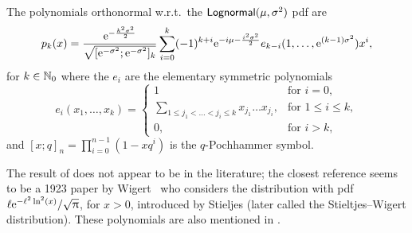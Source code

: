 \begin{theorem}\label{LogNormalOrthogonalPolynomialProposition}
The polynomials orthonormal w.r.t.\ the $\mathsf{Lognormal}(\mu, \sigma^2)$ pdf are
\begin{equation}\label{eq:OrthonormalPolynomialLogNormalExpression}
p_{k}(x) = \frac{ \mathrm{e}^{-\frac{k^{2}\sigma^{2}}{2}} }{ \sqrt{[\mathrm{e}^{-\sigma^{2}} ; \mathrm{e}^{-\sigma^{2}}]_k} } \sum_{i=0}^{k}(-1)^{k+i}\mathrm{e}^{-i\mu-\frac{i^{2}\sigma^{2}}{2}}e_{k-i}(1,\ldots,\mathrm{e}^{(k-1)\sigma^{2}})x^{i},
\end{equation}
for $k\in\mathbb{N}_0$ where the $e_i$ are the elementary symmetric polynomials
\begin{equation}\label{eq:ElementarySymmetricPolynomial}
e_i(x_{1},\ldots,x_{k}) =
\begin{cases}
1 &\mbox{for } i = 0, \\
\sum_{1\leq j_{1}<\ldots<j_{i}\leq k}x_{j_{1}}\ldots x_{j_{i}}, &\mbox{for } 1 \leq i\leq k, \\
0,& \mbox{for } i>k,
\end{cases}
\end{equation}
and $[x; q]_{n}=\prod_{i=0}^{n-1}\left(1-xq^{i}\right)$ is the $q$-Pochhammer symbol.
\end{theorem}

\begin{remark}\label{Rem:27.10b}
The result of 
does not appear to be in the literature; the closest reference
seems to be a 1923 paper by Wigert~\cite{Wi23} who considers
the distribution with pdf
$\ell\mathrm{e}^{-\ell^{2}\ln^{2}(x)}/\sqrt{\uppi}$, for $x>0$, introduced by Stieljes \cite[pp.\ 507--508]{St1894} (later called the Stieltjes--Wigert distribution). These polynomials are also mentioned in \cite[pp.\ 172--175]{Ch11}.
\remQED \end{remark}

